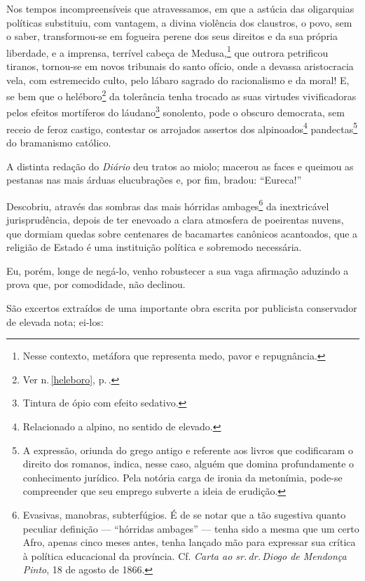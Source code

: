 Nos tempos incompreensíveis que atravessamos, em que a astúcia das
oligarquias políticas substituiu, com vantagem, a divina violência dos
claustros, o povo, sem o saber, transformou-se em fogueira perene dos
seus direitos e da sua própria liberdade, e a imprensa, terrível cabeça
de Medusa,\footnote{Nesse contexto, metáfora que representa medo,
  pavor e repugnância.} que outrora petrificou tiranos, tornou-se em
novos tribunais do santo ofício, onde a devassa aristocracia vela, com
estremecido culto, pelo lábaro sagrado do racionalismo e da moral! E, se
bem que o heléboro\footnote{Ver n.\,\ref{heleboro}, p.\,\pageref{heleboro}.} da tolerância tenha trocado as suas
virtudes vivificadoras pelos efeitos mortíferos do láudano\footnote{
  Tintura de ópio com efeito sedativo.} sonolento, pode o obscuro
democrata, sem receio de feroz castigo, contestar os arrojados assertos
dos alpinoados\footnote{Relacionado a alpino, no sentido de elevado.}
pandectas\footnote{A expressão, oriunda do grego antigo e referente
  aos livros que codificaram o direito dos romanos, indica, nesse caso,
  alguém que domina profundamente o conhecimento jurídico. Pela notória
  carga de ironia da metonímia, pode-se compreender que seu emprego
  subverte a ideia de erudição.} do bramanismo católico.

A distinta redação do \emph{Diário} deu tratos ao miolo; macerou as
faces e queimou as pestanas nas mais árduas elucubrações e, por fim,
bradou: ``Eureca!''

Descobriu, através das sombras das mais hórridas ambages\footnote{
  Evasivas, manobras, subterfúgios. É de se notar que a tão sugestiva
  quanto peculiar definição --- ``hórridas ambages'' --- tenha sido a mesma
  que um certo Afro, apenas cinco meses antes, tenha lançado mão
  para expressar sua crítica à política educacional da província. Cf.
  \emph{Carta ao sr.\,dr.\,Diogo de Mendonça Pinto}, 18 de agosto de 1866.} da
inextricável jurisprudência, depois de ter enevoado a clara atmosfera de
poeirentas nuvens, que dormiam quedas sobre centenares de bacamartes
canônicos acantoados, que a religião de Estado é uma instituição
política e sobremodo necessária.

Eu, porém, longe de negá-lo, venho robustecer a sua vaga afirmação
aduzindo a prova que, por comodidade, não declinou.

São excertos extraídos de uma importante obra escrita por publicista
conservador de elevada nota; ei-los:

